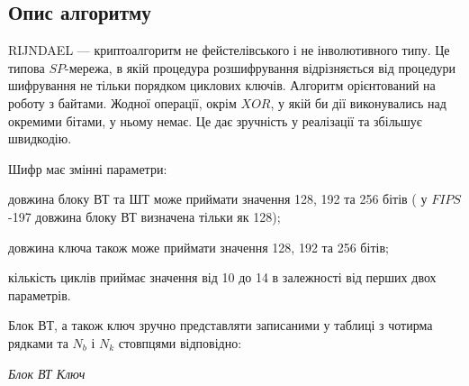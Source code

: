 {{{{{{{{{{{{{{{{{{\begin{definition}
{{{{{{\bigskip


\bigskip

\section{Опис алгоритму}


\bigskip

RIJNDAEL --- криптоалгоритм не фейстелівського і не інволютивного типу.
Це типова $SP$-мережа, в якій процедура розшифрування відрізняється
від процедури шифрування не тільки порядком циклових ключів. Алгоритм
орієнтований на роботу з байтами. Жодної операції, окрім $XOR$, у якій
би дії виконувались над окремими бітами, у ньому немає. Це дає зручність у
реалізації та збільшує швидкодію.

Шифр має змінні параметри:

\liststyleWWviiiNumxxxviii
\beginitemize}
\item довжина блоку ВТ та ШТ може приймати значення 128, 192 та 256 бітів  ( у
$FIPS$-197 довжина блоку ВТ визначена тільки як 128);
\item довжина ключа також може приймати значення 128, 192 та 256 бітів;
\item кількість циклів приймає значення від 10 до 14 в залежності від перших
двох параметрів.
\enditemize}
Блок ВТ, а також ключ зручно представляти записаними у таблиці з чотирма рядками
та  $N_b$ і  $N_k$ стовпцями відповідно:


\bigskip

   \textit{Блок ВТ  Ключ}

}}}}
\end{definition}}}}}}}}}}}}}}}}}}}
